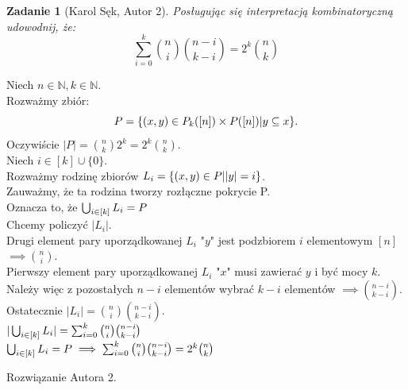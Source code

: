 \documentclass{mwart}
\newcommand{\N}{\mathbb{N}}
\newtheorem{zad}{Zadanie}[section]
\begin{document}
\begin{zad}[Karol Sęk, Autor 2]
    Posługując się interpretacją kombinatoryczną udowodnij, że:
    \[ \sum_{i=0}^{k} \binom{n}{i} \binom{n-i}{k-i} = 2^k \binom{n}{k} \]
\end{zad}
\begin{mdframed}
    Niech $n \in \N , k \in \N$. \\
    Rozważmy zbiór:
    $$P=\{(x,y) \in P_k([n]) \times P([n]) \space|\space y \subseteq x \}.$$
    Oczywiście $|P| = \binom{n}{k}2^k =2^k\binom{n}{k}$. \\

    Niech $i \in [k] \cup \{0\}$.\\
    Rozważmy rodzinę zbiorów $L_i = \{(x,y) \in P \space| \space |y| = i\}$. \\
    Zauważmy, że ta rodzina tworzy rozłączne pokrycie P.\\
    Oznacza to, że $\bigcup_{\small i \in [k]} \space L_i = P$\\

    Chcemy policzyć $|L_i|$.\\
    Drugi element pary uporządkowanej $L_i$ "$y$" jest podzbiorem $i$ elementowym $[n]$ $\implies \binom{n}{i}$.\\
    Pierwszy element pary uporządkowanej $L_i$ "$x$" musi zawierać $y$ i być mocy $k$.\\
    Należy więc z pozostałych $n-i$ elementów wybrać $k-i$ elementów $\implies \binom{n-i}{k-i}$.\\

    Ostatecznie $|L_i| =  \binom{n}{i} \binom{n-i}{k-i}$.\\
    $|\bigcup_{\small i \in [k]} \space L_i | = \sum_{i=0}^{k}\binom{n}{i} \binom{n-i}{k-i}$\\
    $\bigcup_{\small i \in [k]} \space L_i = P \implies \sum_{i=0}^{k}\binom{n}{i} \binom{n-i}{k-i} = 2^k\binom{n}{k}$\\

\end{mdframed}
\begin{mdframed}
    Rozwiązanie Autora 2.
\end{mdframed}
\end{document}
